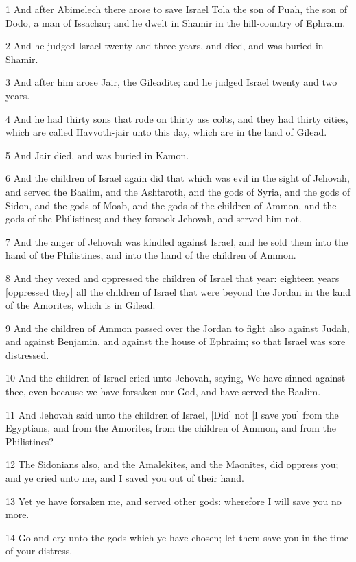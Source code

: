 \par 1 And after Abimelech there arose to save Israel Tola the son of Puah, the son of Dodo, a man of Issachar; and he dwelt in Shamir in the hill-country of Ephraim.
\par 2 And he judged Israel twenty and three years, and died, and was buried in Shamir.
\par 3 And after him arose Jair, the Gileadite; and he judged Israel twenty and two years.
\par 4 And he had thirty sons that rode on thirty ass colts, and they had thirty cities, which are called Havvoth-jair unto this day, which are in the land of Gilead.
\par 5 And Jair died, and was buried in Kamon.
\par 6 And the children of Israel again did that which was evil in the sight of Jehovah, and served the Baalim, and the Ashtaroth, and the gods of Syria, and the gods of Sidon, and the gods of Moab, and the gods of the children of Ammon, and the gods of the Philistines; and they forsook Jehovah, and served him not.
\par 7 And the anger of Jehovah was kindled against Israel, and he sold them into the hand of the Philistines, and into the hand of the children of Ammon.
\par 8 And they vexed and oppressed the children of Israel that year: eighteen years [oppressed they] all the children of Israel that were beyond the Jordan in the land of the Amorites, which is in Gilead.
\par 9 And the children of Ammon passed over the Jordan to fight also against Judah, and against Benjamin, and against the house of Ephraim; so that Israel was sore distressed.
\par 10 And the children of Israel cried unto Jehovah, saying, We have sinned against thee, even because we have forsaken our God, and have served the Baalim.
\par 11 And Jehovah said unto the children of Israel, [Did] not [I save you] from the Egyptians, and from the Amorites, from the children of Ammon, and from the Philistines?
\par 12 The Sidonians also, and the Amalekites, and the Maonites, did oppress you; and ye cried unto me, and I saved you out of their hand.
\par 13 Yet ye have forsaken me, and served other gods: wherefore I will save you no more.
\par 14 Go and cry unto the gods which ye have chosen; let them save you in the time of your distress.
